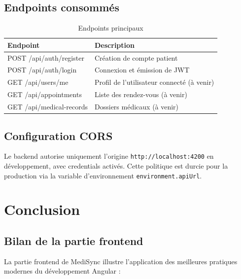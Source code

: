 \documentclass[11pt,a4paper]{article}
\begin{document}
\subsection{Endpoints consommés}

\begin{table}[H]
\centering
\renewcommand{\arraystretch}{1.4}
\begin{tabularx}{\textwidth}{>{\ttfamily}lX}
\toprule
\rowcolor{primary!10}
\textbf{Endpoint} & \textbf{Description} \\
\midrule
POST /api/auth/register & Création de compte patient \\
POST /api/auth/login & Connexion et émission de JWT \\
GET /api/users/me & Profil de l'utilisateur connecté (à venir) \\
GET /api/appointments & Liste des rendez-vous (à venir) \\
GET /api/medical-records & Dossiers médicaux (à venir) \\
\bottomrule
\end{tabularx}
\caption{Endpoints principaux}
\end{table}

\subsection{Configuration CORS}

\begin{successbox}[title={Sécurité}]
Le backend autorise uniquement l'origine \texttt{http://localhost:4200} en
développement, avec credentials activés. Cette politique est durcie pour
la production via la variable d'environnement \texttt{environment.apiUrl}.
\end{successbox}

\newpage

\section{Conclusion}

\subsection{Bilan de la partie frontend}

La partie frontend de MediSync illustre l'application des meilleures
pratiques modernes du développement Angular :
\end{document}
